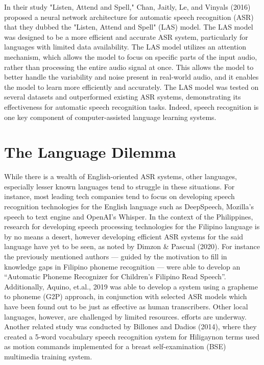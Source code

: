 In their study "Listen, Attend and Spell," Chan, Jaitly, Le, and Vinyals (2016) proposed a neural network architecture for automatic speech recognition (ASR) that they dubbed the "Listen, Attend and Spell" (LAS) model. The LAS model was designed to be a more efficient and accurate ASR system, particularly for languages with limited data availability. The LAS model utilizes an attention mechanism, which allows the model to focus on specific parts of the input audio, rather than processing the entire audio signal at once. This allows the model to better handle the variability and noise present in real-world audio, and it enables the model to learn more efficiently and accurately. The LAS model was tested on several datasets and outperformed existing ASR systems, demonstrating its effectiveness for automatic speech recognition tasks.
Indeed, speech recognition is one key component of computer-assisted language learning systems.


\section{The Language Dilemma}
While there is a wealth of English-oriented ASR systems, other languages, especially lesser known languages tend to struggle in these situations. For instance, most leading tech companies tend to focus on developing speech recognition technologies for the English language such as DeepSpeech, Mozilla’s speech to text engine and OpenAI’s Whisper. In the context of the Philippines, research for developing speech processing technologies for the Filipino language is by no means a desert, however developing efficient ASR systems for the said language have yet to be seen, as noted by Dimzon \& Pascual (2020). For instance the previously mentioned authors — guided by the motivation to fill in knowledge gaps in Filipino phoneme recognition — were able to develop an “Automatic Phoneme Recognizer for Children’s Filipino Read Speech”. Additionally, Aquino, et.al., 2019 was able to develop a system using a grapheme to phoneme (G2P) approach, in conjunction with selected ASR models which have been found out to be just as effective as human transcribers. Other local languages, however, are challenged by limited resources. efforts are underway. Another related study was conducted by Billones and Dadios (2014), where they created a 5-word vocabulary speech recognition system for Hiligaynon terms used as motion commands implemented for a breast self-examination (BSE) multimedia training system.

